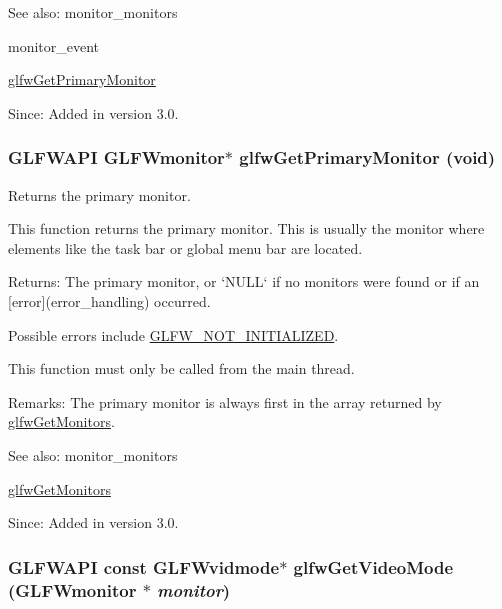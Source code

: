 \begin{Desc}
\item[See also:]monitor\_\-monitors 

monitor\_\-event 

\hyperlink{group__monitor_g59ea49f377fe701dd76764183e64d9f4}{glfwGetPrimaryMonitor}\end{Desc}
\begin{Desc}
\item[Since:]Added in version 3.0. \end{Desc}
\hypertarget{group__monitor_g59ea49f377fe701dd76764183e64d9f4}{
\subsubsection[glfwGetPrimaryMonitor]{\setlength{\rightskip}{0pt plus 5cm}GLFWAPI {\bf GLFWmonitor}$\ast$ glfwGetPrimaryMonitor (void)}}
\label{group__monitor_g59ea49f377fe701dd76764183e64d9f4}


Returns the primary monitor. 

This function returns the primary monitor. This is usually the monitor where elements like the task bar or global menu bar are located.

\begin{Desc}
\item[Returns:]The primary monitor, or `NULL` if no monitors were found or if an \mbox{[}error\mbox{]}(error\_\-handling) occurred.\end{Desc}
Possible errors include \hyperlink{group__errors_g2374ee02c177f12e1fa76ff3ed15e14a}{GLFW\_\-NOT\_\-INITIALIZED}.

This function must only be called from the main thread.

\begin{Desc}
\item[Remarks:]The primary monitor is always first in the array returned by \hyperlink{group__monitor_gb4d483284c57e28837bc2cd9639e9665}{glfwGetMonitors}.\end{Desc}
\begin{Desc}
\item[See also:]monitor\_\-monitors 

\hyperlink{group__monitor_gb4d483284c57e28837bc2cd9639e9665}{glfwGetMonitors}\end{Desc}
\begin{Desc}
\item[Since:]Added in version 3.0. \end{Desc}
\hypertarget{group__monitor_gc234b63ec525c70d7e18ac84aca088c6}{
\subsubsection[glfwGetVideoMode]{\setlength{\rightskip}{0pt plus 5cm}GLFWAPI const {\bf GLFWvidmode}$\ast$ glfwGetVideoMode ({\bf GLFWmonitor} $\ast$ {\em monitor})}}
\label{group__monitor_gc234b63ec525c70d7e18ac84aca088c6}


